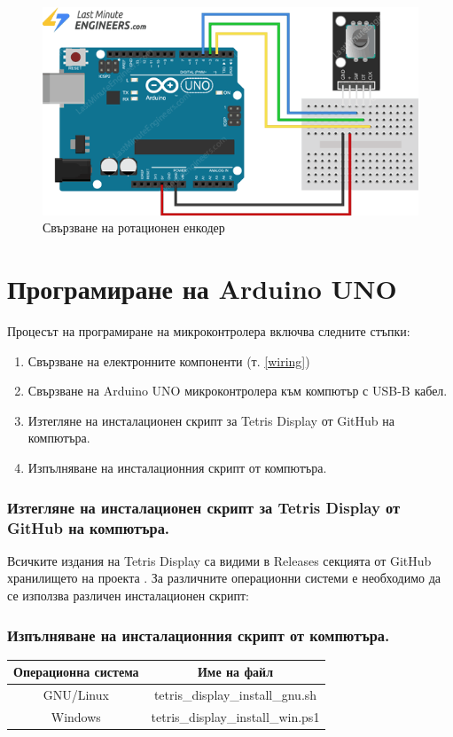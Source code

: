 \documentclass[titlepage, oneside, 14pt]{extbook}
\renewcommand{\texttt}[1]{{\small\ttfamily #1}}
\newcommand{\ard}{Arduino\texttrademark{}}
\begin{document}
\vspace{2cm}

\begin{figure}[!htbp]
    \centering
    \includegraphics[width=0.5\linewidth]{img/encoder_wiring.png}
    \caption{Свързване на ротационен енкодер}
\end{figure}

\section{Програмиране на \ard{} UNO}

Процесът на програмиране на микроконтролера включва следните стъпки:

\begin{enumerate}
  \item Свързване на електронните компоненти (т. \ref{wiring})
  \item Свързване на \ard{} UNO микроконтролера към компютър с USB-B кабел.
  \item Изтегляне на инсталационен скрипт за Tetris Display от GitHub \cite{github} на компютъра.
  \item Изпълняване на инсталационния скрипт от компютъра.
\end{enumerate}

\subsubsection{Изтегляне на инсталационен скрипт за Tetris Display от GitHub на компютъра.}

Всичките издания на Tetris Display са видими в Releases секцията от GitHub хранилището на проекта \cite{github}.
За различните операционни системи е необходимо да се използва различен инсталационен скрипт:

\subsubsection{Изпълняване на инсталационния скрипт от компютъра.}

\begin{center}
  \begin{tabular}{c|c}
    Операционна система & Име на файл \\ 
    \hline
    GNU/Linux & \texttt{tetris_display_install_gnu.sh} \\  
    Windows & \texttt{tetris_display_install_win.ps1} \\  
  \end{tabular}
\end{center}
\end{document}
